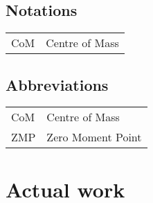 \documentclass{thesisreport}
\begin{document}




 
 
\section*{Notations}
    \begin{tabular}{p{3cm}p{10cm}}
    CoM & Centre of Mass
    \end{tabular}

\newpage

\section*{Abbreviations}

\begin{tabular}{p{3cm}p{10cm}}
CoM & Centre of Mass \\
ZMP & Zero Moment Point \\

\end{tabular}

 \newpage
 
 \tableofcontents

 \listoffigures
 
\listoftables
 

 
 
 


 
 \chapter{Actual work}
  
\end{document}
